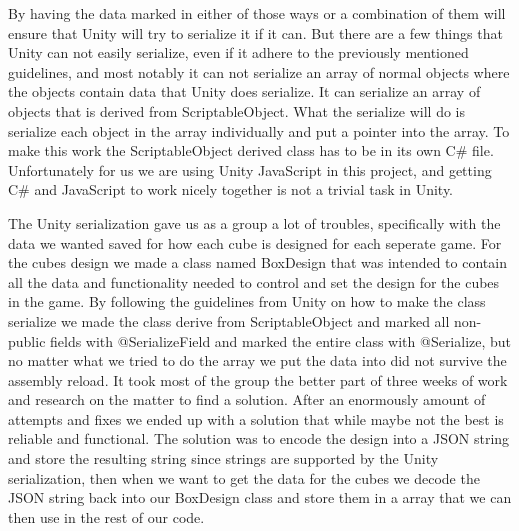 By having the data marked in either of those ways or a combination of them will ensure that Unity will try to serialize it if it can.
But there are a few things that Unity can not easily serialize, even if it adhere to the previously mentioned guidelines, and most notably it can not serialize an array of normal objects where the objects contain data that Unity does serialize.
It can serialize an array of objects that is derived from ScriptableObject. What the serialize will do is serialize each object in the
array individually and put a pointer into the array. To make this work the ScriptableObject derived class has to be in its own
C# file.
Unfortunately for us we are using Unity JavaScript in this project, and getting C# and JavaScript to work nicely
together is not a trivial task in Unity.

The Unity serialization gave us as a group a lot of troubles, specifically with the data we wanted saved for how each cube is designed for each seperate game.
For the cubes design we made a class named BoxDesign that was intended to contain all the data and functionality needed to control and set the design for the cubes in the game.
By following the guidelines from Unity on how to make the class serialize we made the class derive from ScriptableObject and marked all non-public fields with @SerializeField and marked the entire class with @Serialize, but no matter what we tried to do the array we put the data into did not survive the assembly reload.
It took most of the group the better part of three weeks of work and research on the matter to find a solution.
 After an enormously amount of attempts and fixes we ended up with a solution that while maybe not the best is reliable and functional. The solution was to encode the design into a JSON string and store the resulting string since strings are supported by the Unity serialization, then when we want to get the data for the cubes we decode the JSON string back into our BoxDesign class and store them in a array that we can then use in the rest of our code.